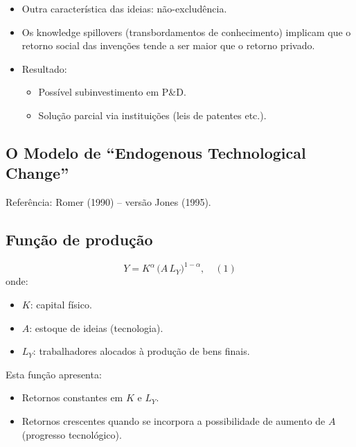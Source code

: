 \documentclass[a4paper,12pt]{article}[abntex2]
\begin{document}
\begin{itemize}
    \item Outra característica das ideias: não-excludência.
    \item Os knowledge spillovers (transbordamentos de conhecimento) 
          implicam que o retorno social das invenções 
          tende a ser maior que o retorno privado.
    \item Resultado:
          \begin{itemize}
            \item Possível subinvestimento em P\&D.
            \item Solução parcial via instituições (leis de patentes etc.).
          \end{itemize}
\end{itemize}


\subsection{\textbf{O Modelo de ``Endogenous Technological Change''}}
Referência: Romer (1990) -- versão Jones (1995).

\subsection{\textbf{Função de produção}}
\[
  Y = K^\alpha \,\bigl(A\,L_Y\bigr)^{1-\alpha},
  \quad (1)
\]
onde:
\begin{itemize}
    \item $K$: capital físico.
    \item $A$: estoque de ideias (tecnologia).
    \item $L_Y$: trabalhadores alocados à produção de bens finais.
\end{itemize}

Esta função apresenta:
\begin{itemize}
    \item Retornos constantes em $K$ e $L_Y$.
    \item Retornos crescentes quando se incorpora a possibilidade de 
          aumento de $A$ (progresso tecnológico).
\end{itemize}
\end{document}
